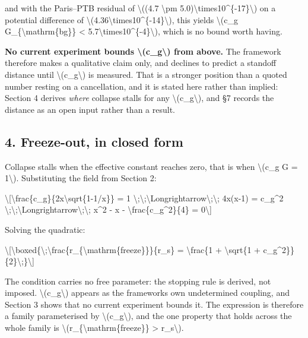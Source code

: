 \documentclass[
  10pt,
]{article}
\begin{document}
and with the Paris--PTB residual of \textbackslash((4.7
\textbackslash pm 5.0)\textbackslash times10\^{}\{-17\}\textbackslash)
on a potential difference of
\textbackslash(4.36\textbackslash times10\^{}\{-14\}\textbackslash),
this yields \textbackslash(c\_g G\_\{\textbackslash mathrm\{bg\}\}
\textless{} 5.7\textbackslash times10\^{}\{-4\}\textbackslash), which is
no bound worth having.

\textbf{No current experiment bounds \textbackslash(c\_g\textbackslash)
from above.} The framework therefore makes a qualitative claim only, and
declines to predict a standoff distance until
\textbackslash(c\_g\textbackslash) is measured. That is a stronger
position than a quoted number resting on a cancellation, and it is
stated here rather than implied: Section 4 derives \emph{where} collapse
stalls for any \textbackslash(c\_g\textbackslash), and §7 records the
distance as an open input rather than a result.

\hypertarget{freeze-out-in-closed-form}{%
\subsection{4. Freeze-out, in closed
form}\label{freeze-out-in-closed-form}}

Collapse stalls when the effective constant reaches zero, that is when
\textbackslash(c\_g G = 1\textbackslash). Substituting the field from
Section 2:

\textbackslash{[}\textbackslash frac\{c\_g\}\{2x\textbackslash sqrt\{1-1/x\}\}
= 1
\textbackslash;\textbackslash;\textbackslash Longrightarrow\textbackslash;\textbackslash;
4x(x-1) = c\_g\^{}2
\textbackslash;\textbackslash;\textbackslash Longrightarrow\textbackslash;\textbackslash;
x\^{}2 - x - \textbackslash frac\{c\_g\^{}2\}\{4\} = 0\textbackslash{]}

Solving the quadratic:

\textbackslash{[}\textbackslash boxed\{\textbackslash;\textbackslash frac\{r\_\{\textbackslash mathrm\{freeze\}\}\}\{r\_s\}
= \textbackslash frac\{1 + \textbackslash sqrt\{1 +
c\_g\^{}2\}\}\{2\}\textbackslash;\}\textbackslash{]}

The condition carries no free parameter: the stopping rule is derived,
not imposed. \textbackslash(c\_g\textbackslash) appears as the
framework\textquotesingle s own undetermined coupling, and Section 3
shows that no current experiment bounds it. The expression is therefore
a family parameterised by \textbackslash(c\_g\textbackslash), and the
one property that holds across the whole family is
\textbackslash(r\_\{\textbackslash mathrm\{freeze\}\} \textgreater{}
r\_s\textbackslash).
\end{document}
